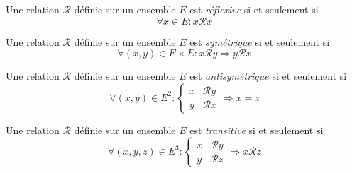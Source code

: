  \begin{defi}
  Une relation $\mathcal R$ définie sur un ensemble $E$ est \emph{réflexive} si et seulement si 
\begin{displaymath}
 \forall x\in E : x \mathcal R x
\end{displaymath}
 \end{defi}

 \begin{defi}
  Une relation $\mathcal R$ définie sur un ensemble $E$ est \emph{symétrique} si et seulement si 
\begin{displaymath}
 \forall (x,y)\in E\times E  : x \mathcal R y \Rightarrow y \mathcal R x
\end{displaymath}
 \end{defi}

\begin{defi}
  Une relation $\mathcal R$ définie sur un ensemble $E$ est \emph{antisymétrique} si et seulement si 
\begin{equation*}
 \forall (x,y)\in E^2  : 
\left\lbrace 
\begin{aligned}
x &\mathcal R y \\
y &\mathcal R x
\end{aligned}
\right. 
 \Rightarrow x = z
\end{equation*}
 \end{defi}


 \begin{defi}
  Une relation $\mathcal R$ définie sur un ensemble $E$ est \emph{transitive} si et seulement si 
\begin{equation*}
 \forall (x,y,z)\in E^3  : 
\left\lbrace 
\begin{aligned}
x &\mathcal R y \\
y &\mathcal R z
\end{aligned}
\right. 
 \Rightarrow x \mathcal R z
\end{equation*}
 \end{defi}

